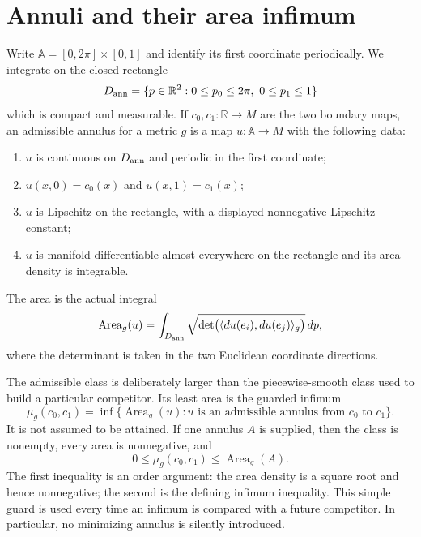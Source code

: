\section{Annuli and their area infimum}
\label{sec:annulus-definitions}

\begin{definition}\label{def:annular-admissible}
Write $\mathbb A=[0,2\pi]\times[0,1]$ and identify its first coordinate
periodically.  We integrate on the closed rectangle
\[
 D_{\rm ann}=\{p\in\mathbb R^2:0\le p_0\le2\pi,\ 0\le p_1\le1\}
\]
which is compact and measurable.  If
$c_0,c_1:\mathbb R\to M$ are the two boundary maps, an admissible annulus
for a metric $g$ is a map $u:\mathbb A\to M$ with the following data:
\begin{enumerate}
\item $u$ is continuous on $D_{\rm ann}$ and periodic in the first
  coordinate;
\item $u(x,0)=c_0(x)$ and $u(x,1)=c_1(x)$;
\item $u$ is Lipschitz on the rectangle, with a displayed nonnegative
  Lipschitz constant;
\item $u$ is manifold-differentiable almost everywhere on the rectangle and
  its area density is integrable.
\end{enumerate}
The area is the actual integral
\[
 \operatorname{Area}_g(u)=\int_{D_{\rm ann}}
       \sqrt{\det\bigl(\langle du(e_i),du(e_j)\rangle_g\bigr)}\,dp,
\]
where the determinant is taken in the two Euclidean coordinate directions.
\end{definition}

\begin{lemma}\label{lem:annular-infimum}
The admissible class is deliberately larger than the piecewise-smooth class
used to build a particular competitor.  Its least area is the guarded
infimum
\[
 \mu_g(c_0,c_1)=\inf\{\operatorname{Area}_g(u):u\text{ is an admissible
 annulus from }c_0\text{ to }c_1\}.
\]
It is not assumed to be attained.  If one annulus $A$ is supplied, then the
class is nonempty, every area is nonnegative, and
\begin{equation}
 0\le\mu_g(c_0,c_1)\le\operatorname{Area}_g(A).
 \label{eq:guarded-infimum}
\end{equation}
The first inequality is an order argument: the area density is a square root
and hence nonnegative; the second is the defining infimum inequality.  This
simple guard is used every time an infimum is compared with a future
competitor.  In particular, no minimizing annulus is silently introduced.
\end{lemma}


